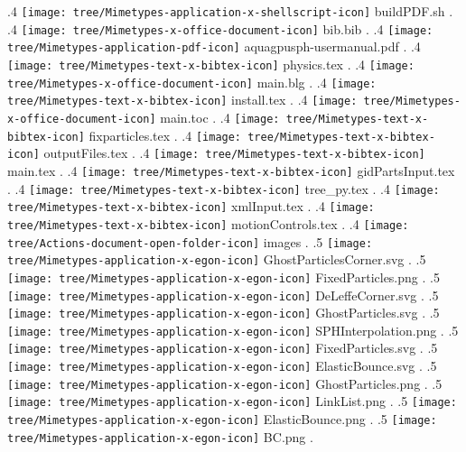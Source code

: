 {.4 { \texttt{[image: tree/Mimetypes-application-x-shellscript-icon]} buildPDF.sh }.
.4 { \texttt{[image: tree/Mimetypes-x-office-document-icon]} bib.bib }.
.4 { \texttt{[image: tree/Mimetypes-application-pdf-icon]} aquagpusph-usermanual.pdf }.
.4 { \texttt{[image: tree/Mimetypes-text-x-bibtex-icon]} physics.tex }.
.4 { \texttt{[image: tree/Mimetypes-x-office-document-icon]} main.blg }.
.4 { \texttt{[image: tree/Mimetypes-text-x-bibtex-icon]} install.tex }.
.4 { \texttt{[image: tree/Mimetypes-x-office-document-icon]} main.toc }.
.4 { \texttt{[image: tree/Mimetypes-text-x-bibtex-icon]} fixparticles.tex }.
.4 { \texttt{[image: tree/Mimetypes-text-x-bibtex-icon]} outputFiles.tex }.
.4 { \texttt{[image: tree/Mimetypes-text-x-bibtex-icon]} main.tex }.
.4 { \texttt{[image: tree/Mimetypes-text-x-bibtex-icon]} gidPartsInput.tex }.
.4 { \texttt{[image: tree/Mimetypes-text-x-bibtex-icon]} tree\_py.tex }.
.4 { \texttt{[image: tree/Mimetypes-text-x-bibtex-icon]} xmlInput.tex }.
.4 { \texttt{[image: tree/Mimetypes-text-x-bibtex-icon]} motionControls.tex }.
.4 { \texttt{[image: tree/Actions-document-open-folder-icon]} images }.
.5 { \texttt{[image: tree/Mimetypes-application-x-egon-icon]} GhostParticlesCorner.svg }.
.5 { \texttt{[image: tree/Mimetypes-application-x-egon-icon]} FixedParticles.png }.
.5 { \texttt{[image: tree/Mimetypes-application-x-egon-icon]} DeLeffeCorner.svg }.
.5 { \texttt{[image: tree/Mimetypes-application-x-egon-icon]} GhostParticles.svg }.
.5 { \texttt{[image: tree/Mimetypes-application-x-egon-icon]} SPHInterpolation.png }.
.5 { \texttt{[image: tree/Mimetypes-application-x-egon-icon]} FixedParticles.svg }.
.5 { \texttt{[image: tree/Mimetypes-application-x-egon-icon]} ElasticBounce.svg }.
.5 { \texttt{[image: tree/Mimetypes-application-x-egon-icon]} GhostParticles.png }.
.5 { \texttt{[image: tree/Mimetypes-application-x-egon-icon]} LinkList.png }.
.5 { \texttt{[image: tree/Mimetypes-application-x-egon-icon]} ElasticBounce.png }.
.5 { \texttt{[image: tree/Mimetypes-application-x-egon-icon]} BC.png }.
}
